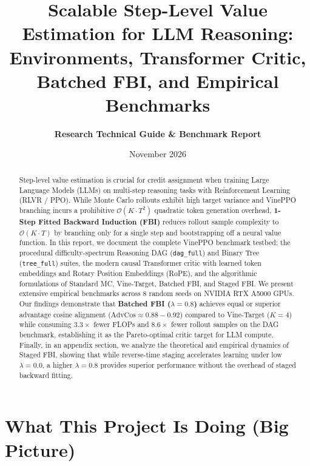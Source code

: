 \documentclass[11pt,a4paper]{article}
\title{\textbf{Scalable Step-Level Value Estimation for LLM Reasoning:\\Environments, Transformer Critic, Batched FBI, and Empirical Benchmarks}}
\author{\textbf{Research Technical Guide \& Benchmark Report}}
\date{November 2026}
\begin{document}
\maketitle

\begin{abstract}
Step-level value estimation is crucial for credit assignment when training Large Language Models (LLMs) on multi-step reasoning tasks with Reinforcement Learning (RLVR / PPO). While Monte Carlo rollouts exhibit high target variance and VinePPO branching incurs a prohibitive $\mathcal{O}(K \cdot T^2)$ quadratic token generation overhead, \textbf{1-Step Fitted Backward Induction (FBI)} reduces rollout sample complexity to $\mathcal{O}(K \cdot T)$ by branching only for a single step and bootstrapping off a neural value function. In this report, we document the complete VinePPO benchmark testbed: the procedural difficulty-spectrum Reasoning DAG (\texttt{dag\_full}) and Binary Tree (\texttt{tree\_full}) suites, the modern causal Transformer critic with learned token embeddings and Rotary Position Embeddings (RoPE), and the algorithmic formulations of Standard MC, Vine-Target, Batched FBI, and Staged FBI. We present extensive empirical benchmarks across 8 random seeds on NVIDIA RTX A5000 GPUs. Our findings demonstrate that \textbf{Batched FBI ($\lambda=0.8$)} achieves equal or superior advantage cosine alignment ($\text{AdvCos} \approx 0.88 - 0.92$) compared to Vine-Target ($K=4$) while consuming $3.3\times$ fewer FLOPs and $8.6\times$ fewer rollout samples on the DAG benchmark, establishing it as the Pareto-optimal critic target for LLM compute. Finally, in an appendix section, we analyze the theoretical and empirical dynamics of Staged FBI, showing that while reverse-time staging accelerates learning under low $\lambda=0.0$, a higher $\lambda=0.8$ provides superior performance without the overhead of staged backward fitting.
\end{abstract}

\vspace{0.3cm}
\tableofcontents
\vspace{0.5cm}

\newpage

\section{What This Project Is Doing (Big Picture)}
\end{document}
